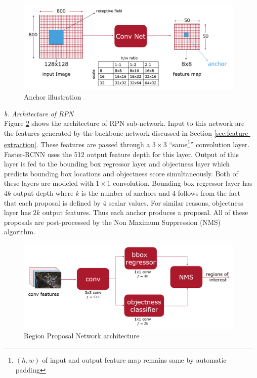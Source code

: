 \begin{figure}
    \centering
    \includegraphics[width=\linewidth]{images/anchors.PNG}
    \caption[Anchor illustration]{Anchor illustration}
    \label{fig:anchors}
\end{figure}

\vspace{5pt}
\textit{b. Architecture of RPN}\\
Figure \ref{fig:RPN-architecture} shows the architecture of RPN sub-network. Input to this network are the features generated by the backbone network discussed in Section \ref{sec:feature-extraction}. These features are passed through a $3\times3$ ``same\footnote{$(h,w)$ of input and output feature map remains same by automatic padding}'' convolution layer. Faster-RCNN uses the 512 output feature depth for this layer. Output of this layer is fed to the bounding box regressor layer and objectness layer which predicts bounding box locations and objectness score simultaneously.
Both of these layers are modeled with $1\times1$ convolution. Bounding box regressor layer has $4k$ output depth where $k$ is the number of anchors and 4 follows from the fact that each proposal is defined by 4 scalar values. For similar reasons, objectness layer has $2k$ output features. Thus each anchor produces a proposal. All of these proposals are post-processed by the Non Maximum Suppression (NMS) algorithm. 


\begin{figure}
    \centering
    \includegraphics[width=\linewidth]{images/RPN-architecture.PNG}
    \caption[RPN architecture]{Region Proposal Network architecture}
    \label{fig:RPN-architecture}
\end{figure}


